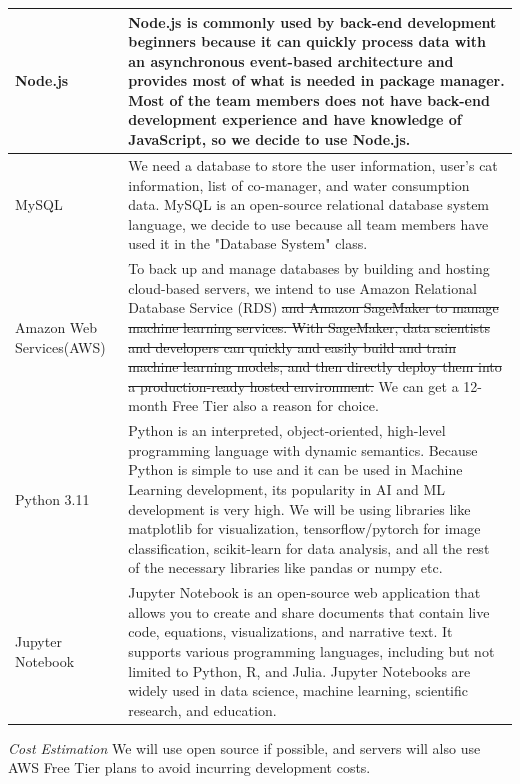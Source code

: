 \documentclass[conference]{IEEEtran}
\begin{document}
\begin{table}[!htbp]\normalsize
\begin{center}
\begin{tabular}{|p{1.8cm}|p{5.8cm}|}
\hline
Node.js & Node.js is commonly used by back-end development beginners because it can quickly process data with an asynchronous event-based architecture and provides most of what is needed in package manager. Most of the team members does not have back-end development experience and have knowledge of JavaScript, so we decide to use Node.js. 
\\ \hline
MySQL & We need a database to store the user information, user's cat information, list of co-manager, and water consumption data. MySQL is an open-source relational database system language, we decide to use because all team members have used it in the "Database System" class.
\\ \hline
Amazon Web Services(AWS) & To back up and manage databases by building and hosting cloud-based servers, we intend to use Amazon Relational Database Service (RDS) \st{and Amazon SageMaker to manage machine learning services. With SageMaker, data scientists and developers can quickly and easily build and train machine learning models, and then directly deploy them into a production-ready hosted environment.} We can get a 12-month Free Tier also a reason for choice.
\\ \hline
Python 3.11 & Python is an interpreted, object-oriented, high-level programming language with dynamic semantics. Because Python is simple to use and it can be used in Machine Learning development, its popularity in AI and ML development is very high. We will be using libraries like matplotlib for visualization, tensorflow/pytorch for image classification, scikit-learn for data analysis, and all the rest of the necessary libraries like pandas or numpy etc.
\\ \hline
Jupyter Notebook & Jupyter Notebook is an open-source web application that allows you to create and share documents that contain live code, equations, visualizations, and narrative text. It supports various programming languages, including but not limited to Python, R, and Julia. Jupyter Notebooks are widely used in data science, machine learning, scientific research, and education.
\\ \hline

\end{tabular}
\label{tab1}
\end{center}
\end{table}
\textit{Cost Estimation}
\newline
We will use open source if possible, and servers will also use AWS Free Tier plans to avoid incurring development costs.
\newline
\end{document}
